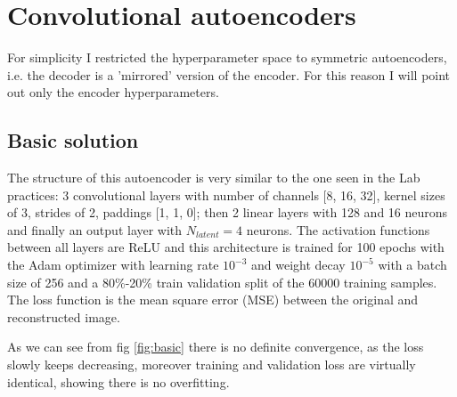 \documentclass[a4paper, 11pt]{article}
\begin{document}
\section{Convolutional autoencoders}
  For simplicity I restricted the hyperparameter space to symmetric autoencoders, i.e. the decoder is a 'mirrored' version of the encoder. For this reason I will point out only the encoder hyperparameters.
  \subsection{Basic solution}
    The structure of this autoencoder is very similar to the one seen in the Lab practices: 3 convolutional layers with number of channels [8, 16, 32], kernel sizes of 3, strides of 2, paddings [1, 1, 0]; then 2 linear layers with 128 and 16 neurons and finally an output layer with $N_{latent} = 4$ neurons. The activation functions between all layers are ReLU and this architecture is trained for 100 epochs with the Adam optimizer with learning rate $10^{-3}$ and weight decay $10^{-5}$ with a batch size of 256 and a 80\%-20\% train validation split of the 60000 training samples. The loss function is the mean square error (MSE) between the original and reconstructed image.

    As we can see from fig \ref{fig:basic} there is no definite convergence, as the loss slowly keeps decreasing, moreover training and validation loss are virtually identical, showing there is no overfitting.

\end{document}

